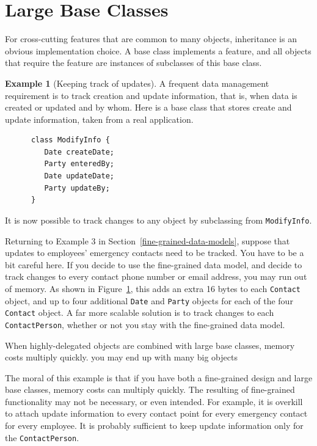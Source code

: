 \documentclass{book}
\theoremstyle{definition}
\newtheorem{example}{Example}
\begin{document}
\section{Large Base Classes}

For cross-cutting features that are common to many objects, inheritance is an obvious implementation choice. A base class implements a feature, and all objects that require the feature are instances of subclasses of this base class. 

\begin{example}[Keeping track of updates] 

A frequent data management requirement is to track creation and update information, that is, when data is created or updated and by whom.  Here is a base class that stores create and update information, taken from a real application.  
\ttfamily
\begin{verbatim}
      class ModifyInfo {
         Date createDate;
         Party enteredBy;
         Date updateDate;
         Party updateBy;
      }
\end{verbatim}
\normalfont
It is now possible to track changes to any object by subclassing from \texttt{ModifyInfo}. 
\end{example}
Returning to Example 3 in Section~\ref{fine-grained-data-models}, suppose that updates to employees' emergency contacts need to be tracked. You have to be a bit careful here. If you decide to use the fine-grained data model, and decide to track changes to every contact phone number or email address, you may run out of memory. As shown in Figure~\ref{}, this adds an extra 16 bytes to each \texttt{Contact} object, and up to four additional \texttt{Date} and \texttt{Party} objects for each of the four \texttt{Contact} object. A far more scalable solution is to track changes to each \texttt{ContactPerson}, whether or not you stay with the fine-grained data model. 

When highly-delegated objects are combined with large base classes, memory costs multiply quickly. 
you may end up with many big objects


The moral of this example is that if you have both a fine-grained design and large base classes, memory costs can multiply quickly. The resulting of fine-grained functionality may not be necessary, or even intended. For example, it is overkill to attach update information to every contact point for every emergency contact for every employee. It is probably sufficient to keep update information only for the \texttt{ContactPerson}. 
\end{document}
